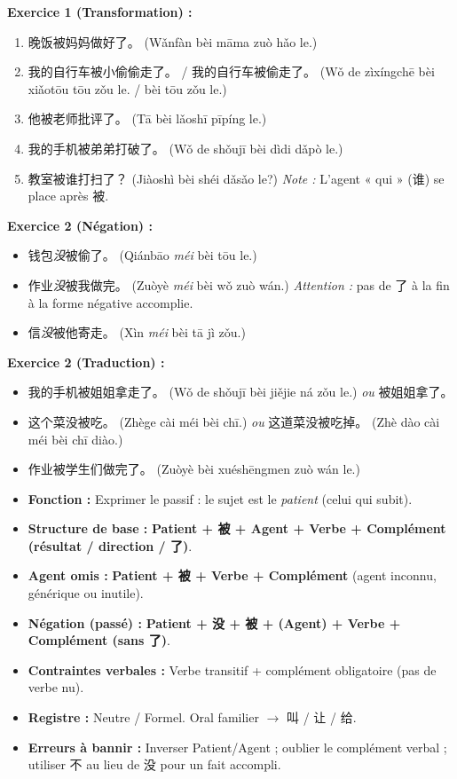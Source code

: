 \documentclass[11pt]{article}
\begin{document}
\begin{exoresolu}
\tcblower
\textbf{Exercice 1 (Transformation) :}
\begin{enumerate}
\item 晚饭被妈妈做好了。 (Wǎnfàn bèi māma zuò hǎo le.)
\item 我的自行车被小偷偷走了。 / 我的自行车被偷走了。 (Wǒ de zìxíngchē bèi xiǎotōu tōu zǒu le. / bèi tōu zǒu le.)
\item 他被老师批评了。 (Tā bèi lǎoshī pīpíng le.)
\item 我的手机被弟弟打破了。 (Wǒ de shǒujī bèi dìdi dǎpò le.)
\item 教室被谁打扫了？ (Jiàoshì bèi shéi dǎsǎo le?) \emph{Note :} L'agent « qui » (谁) se place après 被.
\end{enumerate}

\textbf{Exercice 2 (Négation) :}
\begin{itemize}
\item 钱包\emph{没}被偷了。 (Qiánbāo \emph{méi} bèi tōu le.)
\item 作业\emph{没}被我做完。 (Zuòyè \emph{méi} bèi wǒ zuò wán.) \emph{Attention :} pas de 了 à la fin à la forme négative accomplie.
\item 信\emph{没}被他寄走。 (Xìn \emph{méi} bèi tā jì zǒu.)
\end{itemize}

\textbf{Exercice 2 (Traduction) :}
\begin{itemize}
\item 我的手机被姐姐拿走了。 (Wǒ de shǒujī bèi jiějie ná zǒu le.) \emph{ou} 被姐姐拿了。
\item 这个菜没被吃。 (Zhège cài méi bèi chī.) \emph{ou} 这道菜没被吃掉。 (Zhè dào cài méi bèi chī diào.)
\item 作业被学生们做完了。 (Zuòyè bèi xuéshēngmen zuò wán le.)
\end{itemize}
\end{exoresolu}

\begin{aretenir}
\begin{itemize}
\item \textbf{Fonction :} Exprimer le passif : le sujet est le \emph{patient} (celui qui subit).
\item \textbf{Structure de base :} \textbf{Patient + 被 + Agent + Verbe + Complément (résultat / direction / 了)}.
\item \textbf{Agent omis :} \textbf{Patient + 被 + Verbe + Complément} (agent inconnu, générique ou inutile).
\item \textbf{Négation (passé) :} \textbf{Patient + 没 + 被 + (Agent) + Verbe + Complément (sans 了)}.
\item \textbf{Contraintes verbales :} Verbe transitif + complément obligatoire (pas de verbe nu).
\item \textbf{Registre :} Neutre / Formel. Oral familier $\rightarrow$ 叫 / 让 / 给.
\item \textbf{Erreurs à bannir :} Inverser Patient/Agent ; oublier le complément verbal ; utiliser 不 au lieu de 没 pour un fait accompli.
\end{itemize}
\end{aretenir}
\end{document}
